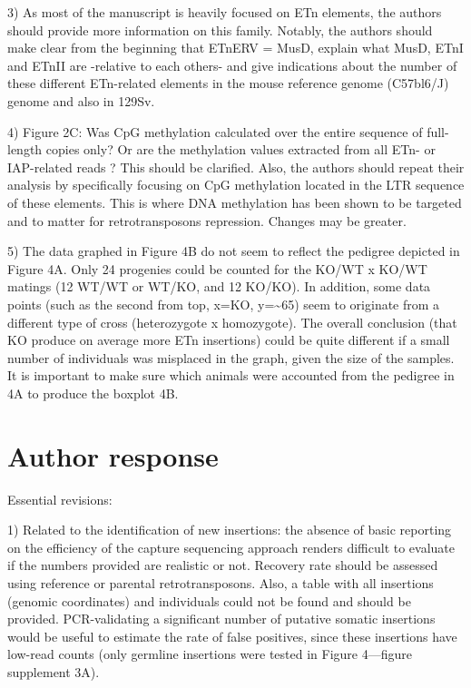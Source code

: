 \documentclass[11pt,a4paper]{article}
\begin{document}
3) As most of the manuscript is heavily focused on ETn elements, the authors should provide more information on this family. Notably, the authors should make clear from the beginning that ETnERV = MusD, explain what MusD, ETnI and ETnII are -relative to each others- and give indications about the number of these different ETn-related elements in the mouse reference genome (C57bl6/J) genome and also in 129Sv.

4) Figure 2C: Was CpG methylation calculated over the entire sequence of full-length copies only? Or are the methylation values extracted from all ETn- or IAP-related reads ? This should be clarified. Also, the authors should repeat their analysis by specifically focusing on CpG methylation located in the LTR sequence of these elements. This is where DNA methylation has been shown to be targeted and to matter for retrotransposons repression. Changes may be greater.

5) The data graphed in Figure 4B do not seem to reflect the pedigree depicted in Figure 4A. Only 24 progenies could be counted for the KO/WT x KO/WT matings (12 WT/WT or WT/KO, and 12 KO/KO). In addition, some data points (such as the second from top, x=KO, y=\textasciitilde{}65) seem to originate from a different type of cross (heterozygote x homozygote). The overall conclusion (that KO produce on average more ETn insertions) could be quite different if a small number of individuals was misplaced in the graph, given the size of the samples. It is important to make sure which animals were accounted from the pedigree in 4A to produce the boxplot 4B.

\section{Author response}

Essential revisions:

1) Related to the identification of new insertions: the absence of basic reporting on the efficiency of the capture sequencing approach renders difficult to evaluate if the numbers provided are realistic or not. Recovery rate should be assessed using reference or parental retrotransposons. Also, a table with all insertions (genomic coordinates) and individuals could not be found and should be provided. PCR-validating a significant number of putative somatic insertions would be useful to estimate the rate of false positives, since these insertions have low-read counts (only germline insertions were tested in Figure 4—figure supplement 3A).
\end{document}
